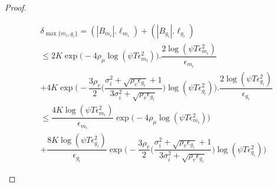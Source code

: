 \begin{proof}
\begin{small}
\begin{align*}
&\delta_{\max\lbrace m_{i}, g_{i}\rbrace}=(|B_{m_{i}}|.\ell_{m_{i}}) + (|B_{g_{i}}|.\ell_{g_{i}})\\
&\leq 2K\exp\bigg(-4\rho_{\mu}\log (\psi T\epsilon_{m_{i}}^{2})\bigg).\dfrac{2\log (\psi T \epsilon_{m_{i}}^{2})}{\epsilon_{m_{i}}}\\
 & + 4K\exp\bigg(- \dfrac{3\rho_v}{2} \bigg(\dfrac{\sigma_{i}^{2}+\sqrt{\rho_{v}\epsilon_{g_{i}}}+1}{3\sigma_{i}^{2}+\sqrt{\rho_v \epsilon_{g_{i}}}}\bigg) \log(\psi T\epsilon_{g_{i}}^{2})\bigg).\dfrac{2\log (\psi T \epsilon_{g_{i}}^{2})}{\epsilon_{g_{i}}} \\
& \leq \dfrac{4K\log (\psi T \epsilon_{m_{i}}^{2})}{\epsilon_{m_{i}}}\exp\bigg(-4\rho_{\mu}\log (\psi T\epsilon_{m_{i}}^{2})\bigg)\\
& + \dfrac{8K\log (\psi T \epsilon_{g_{i}}^{2})}{\epsilon_{g_{i}}}\exp\bigg(- \dfrac{3\rho_v}{2} \bigg(\dfrac{\sigma_{i}^{2}+\sqrt{\rho_{v}\epsilon_{g_{i}}}+1}{3\sigma_{i}^{2}+\sqrt{\rho_v \epsilon_{g_{i}}}}\bigg) \log(\psi T\epsilon_{g_{i}}^{2}) \bigg)
\end{align*}
\end{small}



\end{proof}
